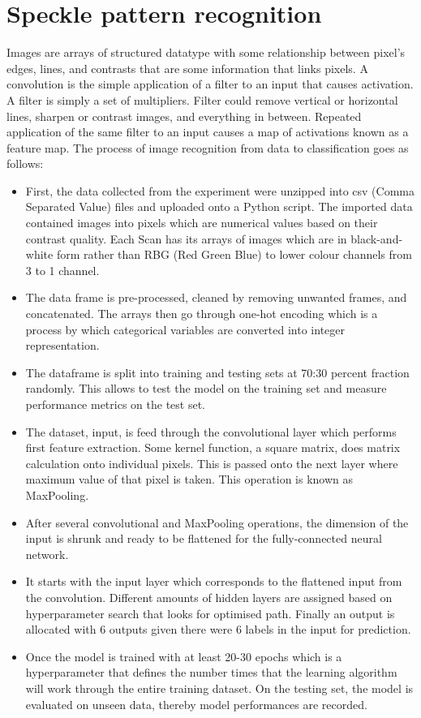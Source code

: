 \vspace{5mm}

\section{Speckle pattern recognition} 

\vspace{5mm}

Images are arrays of structured datatype with some relationship between pixel's edges, lines, and contrasts that are some information that links pixels. A convolution is the simple application of a filter to an input that causes activation. A filter is simply a set of multipliers. Filter could remove vertical or horizontal lines, sharpen or contrast images, and everything in between. Repeated application of the same filter to an input causes a map of activations known as a feature map. The process of image recognition from data to classification goes as follows:

\begin{itemize}
    \item First, the data collected from the experiment were unzipped into csv (Comma Separated Value) files and uploaded onto a Python script. The imported data contained images   into pixels which are numerical values based on their contrast quality. Each Scan has its arrays of images which are in black-and-white form rather than RBG (Red Green Blue) to lower colour channels from 3 to 1 channel.
    \item The data frame is pre-processed, cleaned by removing unwanted frames, and concatenated. The arrays then go through one-hot encoding which is a process by which categorical variables are converted into integer representation. 
    \item The dataframe is split into training and testing sets at 70:30 percent fraction randomly. This allows to test the model on the training set and measure performance metrics on the test set.
    \item The dataset, input, is feed through the convolutional layer which performs first feature extraction. Some kernel function, a square matrix, does matrix calculation onto individual pixels. This is passed onto the next layer where maximum value of that pixel is taken. This operation is known as MaxPooling. 
    \item After several convolutional and MaxPooling operations, the dimension of the input is shrunk and ready to be flattened for the fully-connected neural network.
    \item It starts with the input layer which corresponds to the flattened input from the convolution. Different amounts of hidden layers are assigned based on hyperparameter search that looks for optimised path. Finally an output is allocated with 6 outputs given there were 6 labels in the input for prediction. 
    \item Once the model is trained with at least 20-30 epochs which is a hyperparameter that defines the number times that the learning algorithm will work through the entire training dataset. On the testing set, the model is evaluated on unseen data, thereby model performances are recorded.
\end{itemize}

